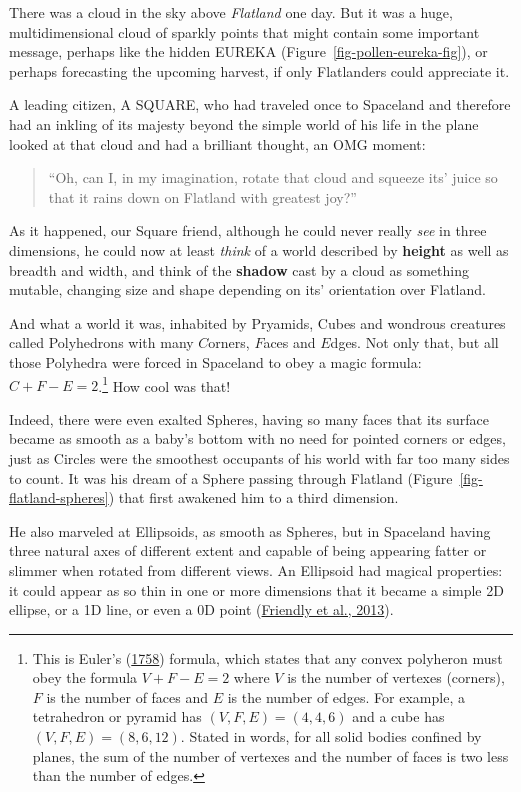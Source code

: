 \documentclass[
  letterpaper,
  10pt,
  krantz2]{krantz}
\begin{document}
There was a cloud in the sky above \emph{Flatland} one day. But it was a
huge, multidimensional cloud of sparkly points that might contain some
important message, perhaps like the hidden EUREKA
(Figure~\ref{fig-pollen-eureka-fig}), or perhaps forecasting the
upcoming harvest, if only Flatlanders could appreciate it.

A leading citizen, A SQUARE, who had traveled once to Spaceland and
therefore had an inkling of its majesty beyond the simple world of his
life in the plane looked at that cloud and had a brilliant thought, an
OMG moment:

\begin{quote}
``Oh, can I, in my imagination, rotate that cloud and squeeze its' juice
so that it rains down on Flatland with greatest joy?''
\end{quote}

As it happened, our Square friend, although he could never really
\emph{see} in three dimensions, he could now at least \emph{think} of a
world described by \textbf{height} as well as breadth and width, and
think of the \textbf{shadow} cast by a cloud as something mutable,
changing size and shape depending on its' orientation over Flatland.

And what a world it was, inhabited by Pryamids, Cubes and wondrous
creatures called Polyhedrons with many \(C\)orners, \(F\)aces and
\(E\)dges. Not only that, but all those Polyhedra were forced in
Spaceland to obey a magic formula: \(C + F - E = 2\).\footnote{This is
  Euler's (\protect\hyperlink{ref-Euler:1758}{1758}) formula, which
  states that any convex polyheron must obey the formula
  \(V + F - E = 2\) where \(V\) is the number of vertexes (corners),
  \(F\) is the number of faces and \(E\) is the number of edges. For
  example, a tetrahedron or pyramid has \((V, F, E) = (4, 4, 6)\) and a
  cube has \((V, F, E) = (8, 6, 12)\). Stated in words, for all solid
  bodies confined by planes, the sum of the number of vertexes and the
  number of faces is two less than the number of edges.} How cool was
that!

Indeed, there were even exalted Spheres, having so many faces that its
surface became as smooth as a baby's bottom with no need for pointed
corners or edges, just as Circles were the smoothest occupants of his
world with far too many sides to count. It was his dream of a Sphere
passing through Flatland (Figure~\ref{fig-flatland-spheres}) that first
awakened him to a third dimension.

He also marveled at Ellipsoids, as smooth as Spheres, but in Spaceland
having three natural axes of different extent and capable of being
appearing fatter or slimmer when rotated from different views. An
Ellipsoid had magical properties: it could appear as so thin in one or
more dimensions that it became a simple 2D ellipse, or a 1D line, or
even a 0D point
(\protect\hyperlink{ref-Friendly-etal:ellipses:2013}{Friendly et al.,
2013}).
\end{document}
